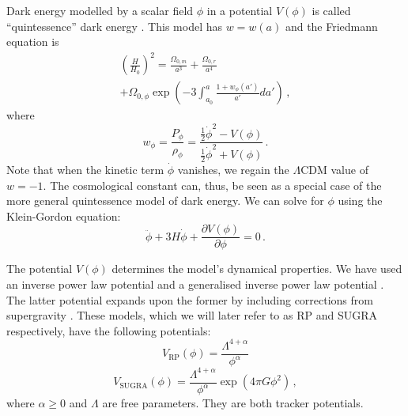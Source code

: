 Dark energy modelled by a scalar field $\phi$ in a potential $V(\phi)$ is called ``quintessence'' dark energy \citep{wetterich88, rp88}. This model has $w = w(a)$ and the Friedmann equation is
\begin{equation}
\begin{split}
	\left(\frac{H}{H_0} \right)^2 = \frac{\Omega_{0,m}}{a^3} + \frac{\Omega_{0,r}}{a^4} \\
	+ \Omega_{0,\phi}\exp\left( -3 \int_{a_0}^a \frac{1+w_\phi(a')}{a'}da' \right) \,,
\end{split}
\end{equation}
where
\begin{equation}
     \label{eqn:w_quintessence}
     w_\phi = \frac{P_\phi}{\rho_\phi} = \frac{\frac{1}{2}\dot{\phi}^2 - V(\phi)}{\frac{1}{2}\dot{\phi}^2 + V(\phi)} \,.
\end{equation}
Note that when the kinetic term $\dot{\phi}$ vanishes, we regain the $\Lambda$CDM value of $w=-1$. The cosmological constant can, thus, be seen as a special case of the more general quintessence model of dark energy. We can solve for $\phi$ using the Klein-Gordon equation:
\begin{equation}
	\ddot{\phi} + 3H\dot{\phi} + \frac{\partial V(\phi)}{\partial \phi} = 0 \,.
\end{equation}

The potential $V(\phi)$ determines the model's dynamical properties. We have used an inverse power law potential \citep{rp88} and a generalised inverse power law potential \citep{brax00}. The latter potential expands upon the former by including corrections from supergravity \citep{freedman76}. These models, which we will later refer to as RP and SUGRA respectively, have the following potentials:
\begin{equation}
	V_\mathrm{RP}(\phi) = \frac{\Lambda^{4+\alpha}}{\phi^\alpha}
\end{equation}
\begin{equation}
	V_\mathrm{SUGRA}(\phi) = \frac{\Lambda^{4+\alpha}}{\phi^\alpha}\exp\left( 4\pi G \phi^2 \right) \,,
\end{equation}
where $\alpha \geqslant 0$ and $\Lambda$ are free parameters. They are both tracker potentials.

